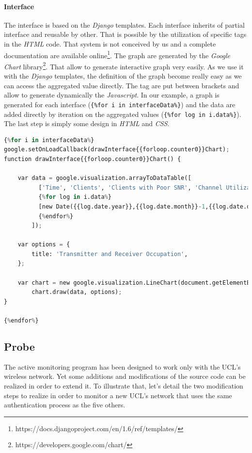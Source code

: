 \paragraph*{Interface} The interface is based on the \emph{Django} templates. Each interface inherits of partial interface and reusable by other. That is possible by the utilization of specific tags in the \emph{HTML} code. That system is not conceived by us and a complete documentation are available online\footnote{https://docs.djangoproject.com/en/1.6/ref/templates/}. The graph are generated by the \emph{Google Chart} library\footnote{https://developers.google.com/chart/}. That allow to generate interactive graph very easily. As we use it with the \emph{Django} templates, the definition of the graph become really easy as we can access the aggregated value directly. The tag are put between brackets and allow to generate dynamically the \emph{Javascript}. In our example, a graph is generated for each interface (\texttt{\{\%for i in interfaceData\%\}}) and the data are added directly by iteration on the aggregated values (\texttt{\{\%for log in i.data\%\}}). The last step is simply some design in \emph{HTML} and \emph{CSS}.\\

\begin{lstlisting}[language=Python, frame=single,breaklines=true,caption={Example of Graph definition}]
{%for i in interfaceData%}
google.setOnLoadCallback(drawInterface{{forloop.counter0}}Chart);
function drawInterface{{forloop.counter0}}Chart() {
		
	var data = google.visualization.arrayToDataTable([
		  ['Time', 'Clients', 'Clients with Poor SNR', 'Channel Utilization'],
		  {%for log in i.data%}
		  [new Date({{log.date.year}},{{log.date.month}}-1,{{log.date.day}},{{log.date.hour}},{{log.date.minute}},{{log.date.second}}), {{log.data.rxUtilization}} , {{log.data.txUtilization}}],
		  {%endfor%}
		]);

	var options = {
		title: 'Transmitter and Receiver Occupation',
	};

	var chart = new google.visualization.LineChart(document.getElementById('interface{{forloop.counter0}}chart_div'));
		chart.draw(data, options);
}

{%endfor%}
\end{lstlisting}

\subsection{Probe}
The active monitoring program has been designed to work only with the UCL's wireless network. Yet some additions and modifications of the source code can be realized in order to extend it. To illustrate that, let's detail the two modification steps to realize in order to monitor a new UCL's network that uses the same authentication process as the five others.

